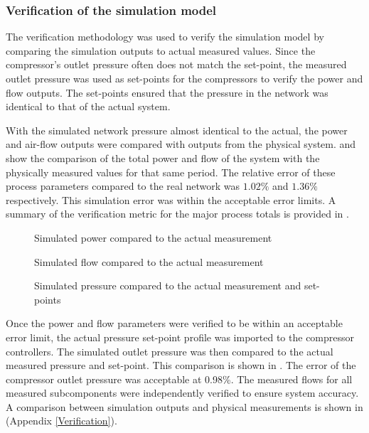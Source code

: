 	\subsubsection{Verification of the simulation model}
	The verification methodology was used to verify the simulation model by comparing the simulation outputs to actual measured values. Since the compressor's outlet pressure often does not match the  set-point, the measured outlet pressure was used as set-points for the compressors to verify the power and flow outputs. The  set-points ensured that the pressure in the network was identical to that of the actual system.
	\par 
 With the simulated network pressure almost identical to the actual, the power and air-flow outputs were compared with outputs from the physical system.  and  show the comparison of the total power and flow of the system with the physically measured values for that same period. The relative error of these process parameters compared to the real network was $1.02 \%$ and $1.36 \%$ respectively. This simulation error was within the acceptable error limits. A summary of the  verification metric for the major process totals is provided in .
 \par
	\begin{figure}[h!]
		\centering
		
		\caption{Simulated power compared to the actual measurement}
		\label{fig: Verification Power kusasalethu}
	\end{figure}
	\begin{figure}[h!]
		\centering
		
		\caption{Simulated flow compared to the actual measurement}
		\label{fig: Verification Flow kusasalethu}
	\end{figure}
	 \begin{figure}[h!]
	 	\centering
	 	
	 	\caption{Simulated pressure compared to the actual measurement and  set-points}
	 	\label{fig: Verification Pressure kusasalethu Setpoint}
	 \end{figure}
	\clearpage
	Once the power and flow parameters were verified to be within an acceptable error limit, the actual pressure  set-point profile was imported to the compressor controllers. The simulated outlet pressure was then compared to the actual measured pressure and  set-point. This comparison is shown in . The error of the compressor outlet pressure was acceptable at 0.98\%. The measured flows for all measured subcomponents were independently verified to ensure system accuracy. A comparison between simulation outputs and physical measurements is shown in  (Appendix \ref{Verification}).	
